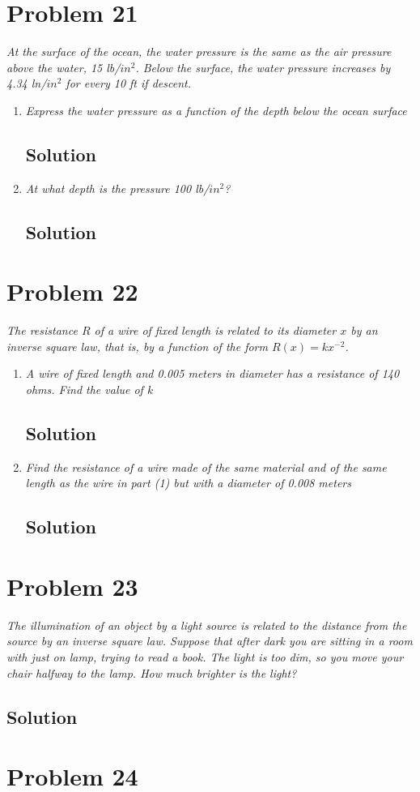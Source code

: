 \documentclass[11pt]{article}
\newcommand{\soln}{\subsection*}
\newcommand{\qn}{\textit}
\begin{document}
\section*{Problem 21}

\qn{At the surface of the ocean, the water pressure is the same as the air pressure above the water, 15 lb/$in^2$. Below the surface, the water pressure increases by 4.34 ln/$in^2$ for every 10 ft if descent.}

\begin{enumerate}
	\item \qn{Express the water pressure as a function of the depth below the ocean surface}
	\soln{Solution}
	
	\item \qn{At what depth is the pressure 100 lb/$in^2$?}
	\soln{Solution}
\end{enumerate}

\section*{Problem 22}

\qn{The resistance $R$ of a wire of fixed length is related to its diameter $x$ by an inverse square law, that is, by a function of the form $R(x)=kx^{-2}$.}

\begin{enumerate}
	\item \qn{A wire of fixed length and 0.005 meters in diameter has a resistance of 140 ohms. Find the value of $k$}
	\soln{Solution}
	
	\item \qn{Find the resistance of a wire made of the same material and of the same length as the wire in part (1) but with a diameter of 0.008 meters}
	\soln{Solution}
\end{enumerate}

\section*{Problem 23}

\qn{The illumination of an object by a light source is related to the distance from the source by an inverse square law. Suppose that after dark you are sitting in a room with just on lamp, trying to read a book. The light is too dim, so you move your chair halfway to the lamp. How much brighter is the light?}

\soln{Solution}

\section*{Problem 24}
\end{document}
